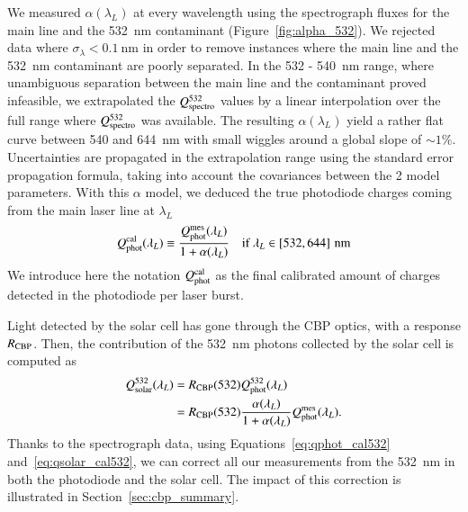 We measured $\alpha(\lambda_L)$ at every wavelength using the spectrograph fluxes for the main line and the \SI{532}{nm} contaminant (Figure~\ref{fig:alpha_532}). We rejected data where $\sigma_{\lambda} < \SI{0.1}{\nm}$ in order to remove instances where the main line and the \SI{532}{nm} contaminant are poorly separated. In the 532 - \SI{540}{nm} range, where unambiguous separation between the main line and the contaminant proved infeasible, we extrapolated the $Q_{\mathrm{spectro}}^{532}$ values by a linear interpolation over the full range where $Q_{\mathrm{spectro}}^{532}$ was available.
The resulting $\alpha(\lambda_L)$ yield a rather flat curve between 540 and \SI{644}{\nm} with small wiggles around a global slope of $\sim 1\% $.
Uncertainties are propagated in the extrapolation range using the standard error propagation formula, taking into account the covariances between the 2 model parameters. With this $\alpha$ model, we deduced the true photodiode charges coming from the main laser line at $\lambda_L$
\begin{equation}
        Q_{\mathrm{phot}}^{\mathrm{cal}}(\lambda_L) \equiv  \frac{Q_{\mathrm{phot}}^{\mathrm{mes}}(\lambda_L)}{1 + \alpha(\lambda_L)} \quad\text{if}\ \lambda_L \in \left[532, 644\right]\mathrm{\,nm}\label{eq:qphot_cal532}
\end{equation}
We introduce here the notation $Q_{\mathrm{phot}}^{\mathrm{cal}}$ as the final calibrated amount of charges detected in the photodiode per laser burst. 

Light detected by the solar cell has gone through the CBP optics, with a response $R_{\mathrm{CBP}}$.
Then, the contribution of the \SI{532}{\nano\meter} photons collected by the solar cell is computed as
\begin{equation}
\begin{aligned}
    Q_{\mathrm{solar}}^{532}(\lambda_L) & = R_{\mathrm{CBP}}(532)  Q_{\mathrm{phot}}^{532}(\lambda_L) \\ 
    & = R_{\mathrm{CBP}}(532) \frac{ \alpha(\lambda_L) }{1+ \alpha(\lambda_L)} Q_{\mathrm{phot}}^{\mathrm{mes}}(\lambda_L).
    \label{eq:qsolar_cal532}
\end{aligned}
\end{equation}
Thanks to the spectrograph data, using Equations~\ref{eq:qphot_cal532} and~\ref{eq:qsolar_cal532}, we can correct all our measurements from the \SI{532}{\nano\meter} in both the photodiode and the solar cell. The impact of this correction is illustrated in Section~\ref{sec:cbp_summary}.


